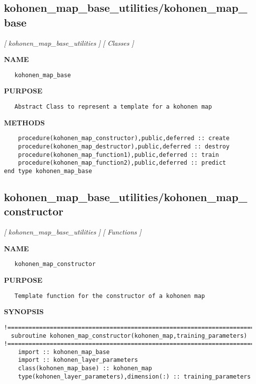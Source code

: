 \documentclass{article}
\begin{document}
\subsection{kohonen\_map\_base\_utilities/kohonen\_map\_base}
\textsl{[ kohonen\_map\_base\_utilities ]}
\textsl{[ Classes ]}

\label{ch:robo18}
\label{ch:kohonen_map_base_utilities_kohonen_map_base}
\textbf{NAME}
\begin{verbatim}
   kohonen_map_base
\end{verbatim}
\textbf{PURPOSE}
\begin{verbatim}
   Abstract Class to represent a template for a kohonen map
\end{verbatim}
\textbf{METHODS}
\begin{verbatim}
    procedure(kohonen_map_constructor),public,deferred :: create
    procedure(kohonen_map_destructor),public,deferred :: destroy
    procedure(kohonen_map_function1),public,deferred :: train 
    procedure(kohonen_map_function2),public,deferred :: predict
end type kohonen_map_base
\end{verbatim}
\newpage
\subsection{kohonen\_map\_base\_utilities/kohonen\_map\_constructor}
\textsl{[ kohonen\_map\_base\_utilities ]}
\textsl{[ Functions ]}

\label{ch:robo19}
\label{ch:kohonen_map_base_utilities_kohonen_map_constructor}
\textbf{NAME}
\begin{verbatim}
   kohonen_map_constructor
\end{verbatim}
\textbf{PURPOSE}
\begin{verbatim}
   Template function for the constructor of a kohonen map
\end{verbatim}
\textbf{SYNOPSIS}
\begin{verbatim}
!========================================================================================
  subroutine kohonen_map_constructor(kohonen_map,training_parameters)
!========================================================================================
    import :: kohonen_map_base
    import :: kohonen_layer_parameters
    class(kohonen_map_base) :: kohonen_map
    type(kohonen_layer_parameters),dimension(:) :: training_parameters
\end{verbatim}
\newpage
\end{document}
